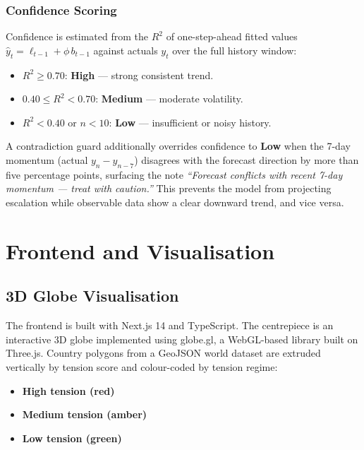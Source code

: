 \documentclass[12pt,a4paper]{report}
\begin{document}
\subsubsection{Confidence Scoring}

Confidence is estimated from the $R^2$ of one-step-ahead fitted values
$\hat{y}_{t} = \ell_{t-1} + \phi\,b_{t-1}$ against actuals $y_t$
over the full history window:

\begin{itemize}
  \item $R^2 \geq 0.70$: \textbf{High} --- strong consistent trend.
  \item $0.40 \leq R^2 < 0.70$: \textbf{Medium} --- moderate volatility.
  \item $R^2 < 0.40$ or $n < 10$: \textbf{Low} --- insufficient or noisy history.
\end{itemize}

A contradiction guard additionally overrides confidence to \textbf{Low}
when the 7-day momentum (actual $y_n - y_{n-7}$) disagrees with the
forecast direction by more than five percentage points, surfacing the
note \emph{``Forecast conflicts with recent 7-day momentum --- treat
with caution.''} This prevents the model from projecting escalation
while observable data show a clear downward trend, and vice versa.

\section{Frontend and Visualisation}

\subsection{3D Globe Visualisation}

The frontend is built with Next.js 14 and TypeScript. The centrepiece is
an interactive 3D globe implemented using globe.gl, a WebGL-based
library built on Three.js. Country polygons from a GeoJSON world dataset
are extruded vertically by tension score and colour-coded by tension
regime:

\begin{itemize}
  \item \textbf{High tension (red)}
  \item \textbf{Medium tension (amber)}
     
  \item \textbf{Low tension (green)}
\end{itemize}
\end{document}
